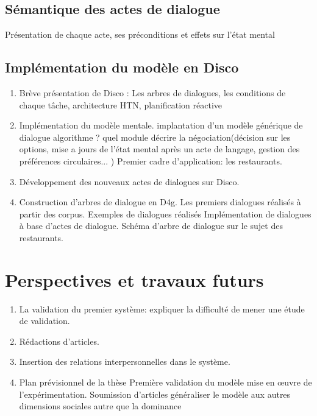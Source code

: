 \documentclass[a4paper,french]{article}
\begin{document}
\subsection{Sémantique des actes de dialogue}
Présentation de chaque acte, ses préconditions et effets sur l'état mental

\subsection{Implémentation du modèle en Disco}
\begin{enumerate}
\item Brève présentation de Disco : Les arbres de dialogues, les conditions de chaque tâche, architecture HTN, planification réactive
\item Implémentation du modèle mentale.	
\subsubitem implantation d'un modèle générique de dialogue
\subsubitem algorithme ? quel module décrire la négociation(décision sur les options, mise a jours de l’état mental après un acte de langage, gestion des préférences circulaires... )
\subsubitem Premier cadre d'application: les restaurants. 
\item Développement des nouveaux actes de dialogues sur Disco. 
\item Construction d'arbres de dialogue en D4g.
\subitem Les premiers dialogues réalisés à partir  des corpus.
\subsubitem Exemples de dialogues réalisés
\subitem Implémentation de dialogues à base d'actes de dialogue. 
\subsubitem Schéma d'arbre de dialogue sur le sujet des restaurants. 
\end{enumerate}

\section{Perspectives et travaux futurs}
\label{pers}
\begin{enumerate}
\item La validation du premier système: expliquer la difficulté de mener une étude de validation.
\item Rédactions d'articles.
\item Insertion des relations interpersonnelles dans le système.
\item Plan prévisionnel de la thèse
 \subitem Première validation du modèle
 	\subsubitem mise en œuvre de l’expérimentation.
 \subitem Soumission d'articles
 \subitem généraliser le modèle aux autres dimensions sociales autre que la dominance
\end{enumerate}
	\vskip 4pt
	
	{\footnotesize
			} %
	
\end{document}
